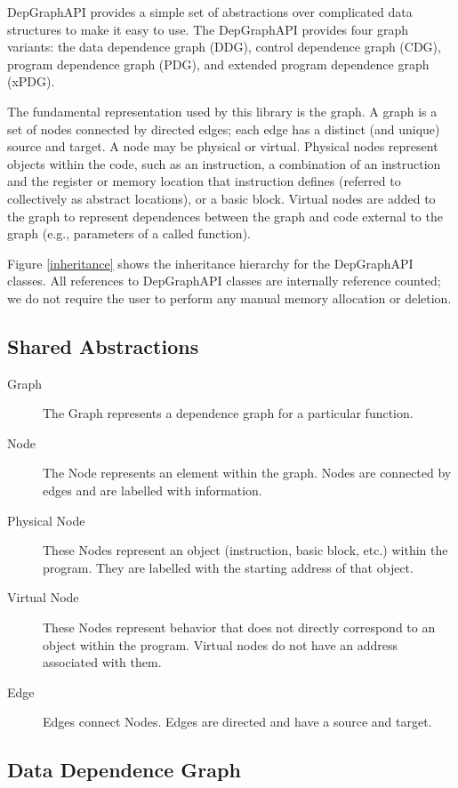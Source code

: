 \documentclass[12pt,titlepage]{article}
\begin{document}
DepGraphAPI provides a simple set of abstractions over complicated
data structures to make it easy to use. The DepGraphAPI provides four
graph variants: the data dependence graph (DDG), control dependence
graph (CDG), program dependence graph (PDG), and extended program dependence
graph (xPDG).

The fundamental representation used by this library is the graph. A
graph is a set of nodes connected by directed edges; each edge has a
distinct (and unique) source and target. A node may be physical or
virtual. Physical nodes represent objects within the code, such as an
instruction, a combination of an instruction and the register or
memory location that instruction defines (referred to collectively as
abstract locations), or a basic block. Virtual nodes are added to the
graph to represent dependences between the graph and code external to
the graph (e.g., parameters of a called function).

Figure \ref{inheritance} shows the
inheritance hierarchy for the DepGraphAPI classes. All references to
DepGraphAPI classes are internally reference counted; we do not
require the user to perform any manual memory allocation or deletion.

\subsection{Shared Abstractions}

\begin{description}
\item[Graph] The Graph represents a dependence graph for a particular
function.
\item[Node] The Node represents an element within the graph. Nodes are
connected by edges and are labelled with information.
\item[Physical Node] These Nodes represent an object  (instruction, basic
block, etc.) within the program. They are labelled with the starting address
of that object.
\item[Virtual Node] These Nodes represent behavior that does not
directly correspond to an object within the program. Virtual nodes do not have
an address associated with them.
\item[Edge] Edges connect Nodes. Edges are directed and have a source
and target.
\end{description}

\subsection{Data Dependence Graph}
\end{document}
